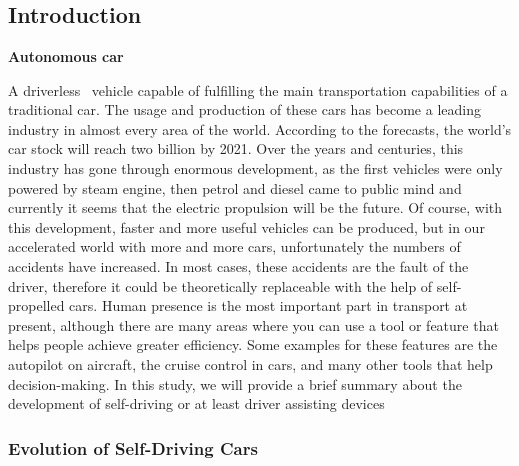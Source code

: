 \chapter{}
\section{Introduction}
{\textbf{Autonomous car}}

A driverless~\cite{liden2017driverless} vehicle capable of fulfilling the main transportation capabilities of a traditional car. The usage and production of these cars has become a leading industry in almost every area of the world. According to the forecasts, the world’s car stock will reach two billion by 2021. Over the years and centuries, this industry has gone through enormous development, as the first vehicles were only powered by steam engine, then petrol and diesel came to public mind and currently it seems that the electric propulsion will be the future. Of course, with this development, faster and more useful vehicles can be produced, but in our accelerated world with more  and more cars, unfortunately the numbers of accidents have increased. In most cases, these accidents are the fault of the driver, therefore it could be theoretically replaceable with the help of self-propelled cars.  Human presence is the most important part in transport at present, although there are many areas where you can use a tool or feature that helps people achieve greater efficiency. Some examples for these features are the autopilot on  aircraft, the cruise control in cars, and many other tools that help decision-making. In this study, we will provide a brief summary about the development of self-driving or at least driver assisting devices 

\subsection{Evolution of Self-Driving Cars}

